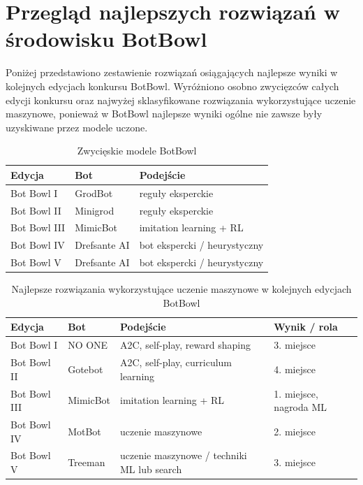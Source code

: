 \section{Przegląd najlepszych rozwiązań w środowisku BotBowl}

Poniżej przedstawiono zestawienie rozwiązań osiągających najlepsze wyniki w kolejnych edycjach konkursu BotBowl. Wyróżniono osobno zwycięzców całych edycji konkursu oraz najwyżej sklasyfikowane rozwiązania wykorzystujące uczenie maszynowe, ponieważ w BotBowl najlepsze wyniki ogólne nie zawsze były uzyskiwane przez modele uczone.

\begin{table}[H]
	\centering
	\caption{Zwycięskie modele BotBowl}
	\label{tab:botbowl-sota}
	\begin{tabular}{lll}
		\hline
		Edycja & Bot & Podejście \\
		\hline
		Bot Bowl I & GrodBot & reguły eksperckie \\
		Bot Bowl II & Minigrod & reguły eksperckie  \\
		Bot Bowl III & MimicBot & imitation learning + RL \\
		Bot Bowl IV & Drefsante AI & bot ekspercki / heurystyczny  \\
		Bot Bowl V & Drefsante AI & bot ekspercki / heurystyczny  \\
		\hline
	\end{tabular}
\end{table}

\begin{table}[H]
	\centering
	\caption{Najlepsze rozwiązania wykorzystujące uczenie maszynowe w kolejnych edycjach BotBowl}
	\label{tab:botbowl-sota-ml}
	\begin{tabular}{llll}
		\hline
		Edycja & Bot & Podejście & Wynik / rola \\
		\hline
		Bot Bowl I & NO ONE & A2C, self-play, reward shaping & 3. miejsce \\
		Bot Bowl II & Gotebot & A2C, self-play, curriculum learning & 4. miejsce\\
		Bot Bowl III & MimicBot & imitation learning + RL & 1. miejsce, nagroda ML \\
		Bot Bowl IV & MotBot & uczenie maszynowe & 2. miejsce \\
		Bot Bowl V & Treeman & uczenie maszynowe / techniki ML lub search & 3. miejsce \\
		\hline
	\end{tabular}
\end{table}


